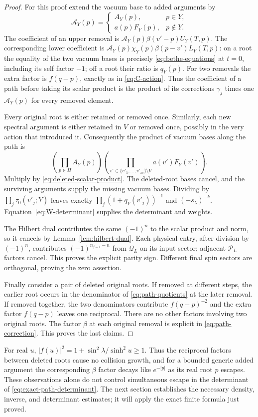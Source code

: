\begin{proof}
For this proof extend the vacuum base to added arguments by
\[
 \mathcal A_Y(p)=
 \begin{cases}
  A_Y(p),&p\in Y,\\
  a(p)F_Y(p),&p\notin Y.
 \end{cases}
\]
The coefficient of an upper removal is
$\mathcal A_Y(p)\beta(v'-p)U_Y(T,p)$.
The corresponding lower coefficient is
$\mathcal A_Y(p)\chi_Y(p)\beta(p-v')L_Y(T,p)$:
on a root the equality of the two vacuum bases is precisely
\eqref{eq:bethe-equations} at $t=0$, including its self factor $-1$;
off a root their ratio is $q_Y(p)$.
For two removals the extra factor is $f(q-p)$, exactly as in
\eqref{eq:C-action}.  Thus the coefficient of a path before taking its
scalar product is the product of its corrections $\gamma_j$ times one
$\mathcal A_Y(p)$ for every removed element.

Every original root is either retained or removed once.  Similarly,
each new spectral argument is either retained in $V$ or removed once,
possibly in the very action that introduced it.  Consequently the
product of vacuum bases along the path is
\[
 \left(\prod_{p\in H}A_Y(p)\right)
 \left(\prod_{v'\in\{v'_1,\ldots,v'_m\}\setminus V}
                       a(v')F_Y(v')\right).
\]
Multiply by \eqref{eq:deleted-scalar-product}.  The deleted-root bases
cancel, and the surviving arguments supply the missing vacuum bases.
Dividing by $\prod_j\tau_0(v'_j;Y)$ leaves exactly
$\prod_j(1+q_Y(v'_j))^{-1}$ and $(-s_\lambda)^{-k}$.
Equation~\eqref{eq:W-determinant} supplies the determinant and weights.

The Hilbert dual contributes the same $(-1)^n$ to the scalar product
and norm, so it cancels by Lemma~\ref{lem:hilbert-dual}.  Each physical
entry, after division by $(-1)^n$, contributes
$(-1)^{n_{j-1}-n}$ from $\mathcal Q_L$ on its input sector; adjacent
$\mathcal P_L$ factors cancel.  This proves the explicit parity sign.
Different final spin sectors are orthogonal, proving the zero
assertion.

Finally consider a pair of deleted original roots.  If removed at
different steps, the earlier root occurs in the denominator of
\eqref{eq:path-quotients} at the later removal.  If removed together,
the two denominators contribute $f(q-p)^{-2}$ and the extra factor
$f(q-p)$ leaves one reciprocal.  There are no other factors involving
two original roots.  The factor $\beta$ at each original removal is
explicit in \eqref{eq:path-correction}.  This proves the last claims.
\end{proof}

For real $u$, $|f(u)|^2=1+\sin^2\lambda/\sinh^2u\ge1$.
Thus the reciprocal factors between deleted roots cause no collision
growth, and for a bounded generic added argument the corresponding
$\beta$ factor decays like $e^{-|p|}$ as its real root $p$ escapes.
These observations alone do not control simultaneous escape in the
determinant of \eqref{eq:exact-path-determinant}.  The next section
establishes the necessary density, inverse, and determinant estimates;
it will apply the exact finite formula just proved.

